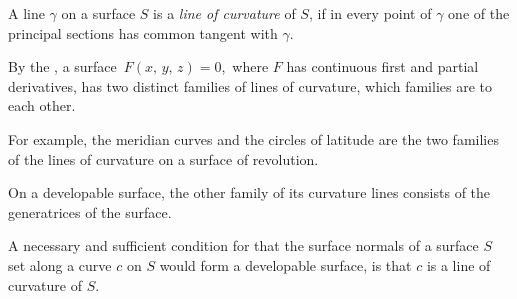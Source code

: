 \documentclass[12pt]{article}
\theoremstyle{definition}
\begin{document}
A line $\gamma$ on a surface $S$ is a {\em line of curvature} of $S$, if in every point of $\gamma$ one of the principal sections has common tangent with $\gamma$.

By the , a surface \,$F(x,\,y,\,z) = 0$,\, where $F$ has continuous first and  partial derivatives, has two distinct families of lines of curvature, which families are  to each other.

For example, the meridian curves and the circles of latitude are the two families of the lines of curvature on a surface of revolution.

On a developable surface, the other family of its curvature lines consists of the generatrices of the surface.

A necessary and sufficient condition for that the surface normals of a surface $S$ set along a curve $c$ on $S$ would form a developable surface, is that $c$ is a line of curvature of $S$.


\end{document}
